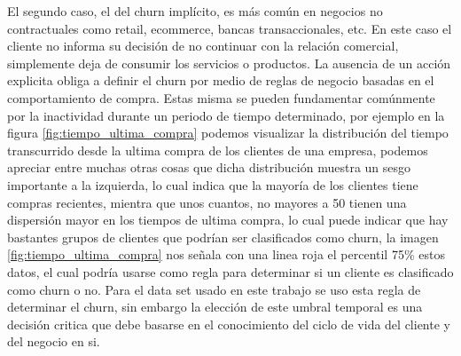 El segundo caso, el del churn implícito, es más común en negocios no contractuales como retail, ecommerce, bancas transaccionales, etc. En este caso el cliente no informa su decisión de no continuar con la relación comercial, simplemente deja de consumir los servicios o productos. La ausencia de un acción explicita obliga a definir el churn por medio de reglas de negocio basadas en el comportamiento de compra. Estas misma se pueden fundamentar comúnmente por la inactividad durante un periodo de tiempo determinado, por ejemplo en la figura \ref{fig:tiempo_ultima_compra} podemos visualizar la distribución del tiempo transcurrido desde la ultima compra de los clientes de una empresa, podemos apreciar entre muchas otras cosas que dicha distribución muestra un sesgo importante a la izquierda, lo cual indica que la mayoría de los clientes tiene compras recientes, mientra que unos cuantos, no mayores a 50 tienen una dispersión mayor en los tiempos de ultima compra, lo cual puede indicar que hay bastantes grupos de clientes que podrían ser clasificados como churn, la imagen \ref{fig:tiempo_ultima_compra} nos señala con una linea roja el percentil 75\% estos datos, el cual podría usarse como regla para determinar si un cliente es clasificado como churn o no. Para el data set usado en este trabajo se uso esta regla de determinar el churn, sin embargo la elección de este umbral temporal es una decisión critica que debe basarse en el conocimiento del ciclo de vida del cliente y del negocio en si.

